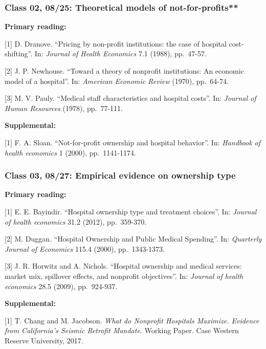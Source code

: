 \documentclass[11pt,]{article}
\begin{document}
\hypertarget{class-02-0825-theoretical-models-of-not-for-profits}{%
\subsubsection{Class 02, 08/25: Theoretical models of
not-for-profits**}\label{class-02-0825-theoretical-models-of-not-for-profits}}

\textbf{Primary reading:}

{[}1{]} D. Dranove. ``Pricing by non-profit institutions: the case of
hospital cost-shifting''. In: \emph{Journal of Health Economics} 7.1
(1988), pp.~47-57.

{[}2{]} J. P. Newhouse. ``Toward a theory of nonprofit institutions: An
economic model of a hospital''. In: \emph{American Economic Review}
(1970), pp.~64-74.

{[}3{]} M. V. Pauly. ``Medical staff characteristics and hospital
costs''. In: \emph{Journal of Human Resources} (1978), pp.~77-111.

\textbf{Supplemental:}

{[}1{]} F. A. Sloan. ``Not-for-profit ownership and hospital behavior''.
In: \emph{Handbook of health economics} 1 (2000), pp.~1141-1174.

\hypertarget{class-03-0827-empirical-evidence-on-ownership-type}{%
\subsubsection{Class 03, 08/27: Empirical evidence on ownership
type}\label{class-03-0827-empirical-evidence-on-ownership-type}}

\textbf{Primary reading:}

{[}1{]} E. E. Bayindir. ``Hospital ownership type and treatment
choices''. In: \emph{Journal of health economics} 31.2 (2012),
pp.~359-370.

{[}2{]} M. Duggan. ``Hospital Ownership and Public Medical Spending''.
In: \emph{Quarterly Journal of Economics} 115.4 (2000), pp.~1343-1373.

{[}3{]} J. R. Horwitz and A. Nichols. ``Hospital ownership and medical
services: market mix, spillover effects, and nonprofit objectives''. In:
\emph{Journal of health economics} 28.5 (2009), pp.~924-937.

\textbf{Supplemental:}

{[}1{]} T. Chang and M. Jacobson. \emph{What do Nonprofit Hospitals
Maximize. Evidence from California's Seismic Retrofit Mandate}. Working
Paper. Case Western Reserve University, 2017.
\end{document}
